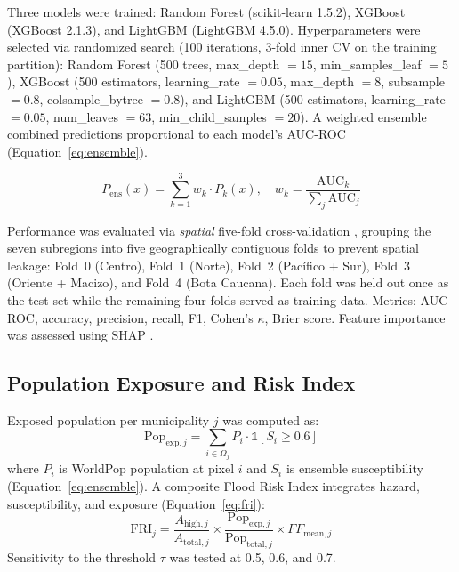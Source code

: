 \documentclass{article}
\begin{document}
Three models were trained: Random Forest \citep{Breiman2001} (scikit-learn 1.5.2), XGBoost \citep{Chen2016} (XGBoost 2.1.3), and LightGBM \citep{Ke2017} (LightGBM 4.5.0). Hyperparameters were selected via randomized search (100 iterations, 3-fold inner CV on the training partition): Random Forest (500 trees, max\_depth $= 15$, min\_samples\_leaf $= 5$), XGBoost (500 estimators, learning\_rate $= 0.05$, max\_depth $= 8$, subsample $= 0.8$, colsample\_bytree $= 0.8$), and LightGBM (500 estimators, learning\_rate $= 0.05$, num\_leaves $= 63$, min\_child\_samples $= 20$). A weighted ensemble combined predictions proportional to each model's AUC-ROC (Equation~\ref{eq:ensemble}).

\begin{equation}
    P_{\text{ens}}(x) = \sum_{k=1}^{3} w_k \cdot P_k(x), \quad w_k = \frac{\text{AUC}_k}{\sum_{j} \text{AUC}_j}
    \label{eq:ensemble}
\end{equation}

Performance was evaluated via \textit{spatial} five-fold cross-validation \citep{Roberts2017}, grouping the seven subregions into five geographically contiguous folds to prevent spatial leakage: Fold~0 (Centro), Fold~1 (Norte), Fold~2 (Pac\'ifico + Sur), Fold~3 (Oriente + Macizo), and Fold~4 (Bota Caucana). Each fold was held out once as the test set while the remaining four folds served as training data. Metrics: AUC-ROC, accuracy, precision, recall, F1, Cohen's $\kappa$, Brier score. Feature importance was assessed using SHAP \citep{Lundberg2017}.

\subsection{Population Exposure and Risk Index}

Exposed population per municipality $j$ was computed as:
\begin{equation}
    \text{Pop}_{\text{exp},j} = \sum_{i \in \Omega_j} P_i \cdot \mathbb{1}[S_i \geq 0.6]
    \label{eq:pop_exposure}
\end{equation}
where $P_i$ is WorldPop population at pixel $i$ and $S_i$ is ensemble susceptibility (Equation~\ref{eq:ensemble}). A composite Flood Risk Index integrates hazard, susceptibility, and exposure (Equation~\ref{eq:fri}):
\begin{equation}
    \text{FRI}_j = \frac{A_{\text{high},j}}{A_{\text{total},j}} \times \frac{\text{Pop}_{\text{exp},j}}{\text{Pop}_{\text{total},j}} \times FF_{\text{mean},j}
    \label{eq:fri}
\end{equation}
Sensitivity to the threshold $\tau$ was tested at 0.5, 0.6, and 0.7.
\end{document}
